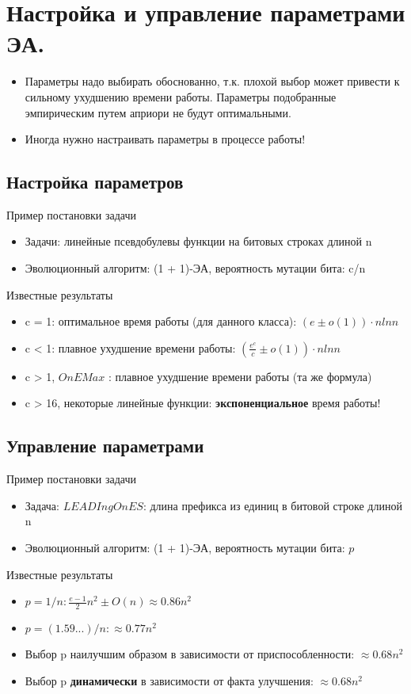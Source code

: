 \section{Настройка и управление параметрами ЭА.}

\begin{itemize}
    \item Параметры надо выбирать обоснованно, т.к. плохой выбор может привести к сильному ухудшению времени работы. Параметры подобранные эмпирическим путем априори не будут оптимальными.
    \item Иногда нужно настраивать параметры в процессе работы!
\end{itemize}

\subsection{Настройка параметров}
Пример постановки задачи
\begin{itemize}
    \item Задачи: линейные псевдобулевы функции на битовых строках длиной n 
    \item Эволюционный алгоритм: (1 + 1)-ЭА, вероятность мутации бита: c/n
\end{itemize}


Известные результаты
\begin{itemize}
    \item c = 1: оптимальное время работы (для данного класса): $(e ± o(1)) · n ln n $
    \item c < 1: плавное ухудшение времени работы: $( \frac{e^c}{c} ± o(1)) · n ln n$
    \item c > 1, $OnEMax$ : плавное ухудшение времени работы (та же формула)
    \item c > 16, некоторые линейные функции: \textbf{экспоненциальное} время работы! 
\end{itemize}


\subsection{Управление параметрами}
Пример постановки задачи
\begin{itemize}
    \item Задача: $LEADIngOnES$: длина префикса из единиц в битовой строке длиной n 
    \item Эволюционный алгоритм: (1 + 1)-ЭА, вероятность мутации бита: $p$
\end{itemize}


Известные результаты
\begin{itemize}
    \item $p = 1/n: \frac{e-1}{2} n^2 ± O(n) \approx 0.86n^2$
    \item $p = (1.59...)/n: \approx 0.77n^2$
    \item Выбор p наилучшим образом в зависимости от приспособленности: \textbf{$\approx 0.68n^2$}
    \item Выбор p \textbf{динамически} в зависимости от факта улучшения: \textbf{$\approx 0.68n^2$}
\end{itemize}
    